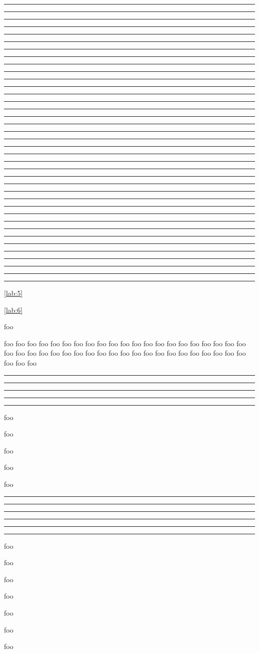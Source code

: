 \documentclass[UTF8,hyperref]{ctexart}
\def\testitem{\item\rule{\ecolswidth}{1pt}}
\begin{document}
\begin{enumcols}[3]
\testitem
\testitem
\testitem
\testitem
\testitem
\testitem
\testitem
\testitem
\testitem
\testitem
\testitem
\testitem
\testitem
\testitem
\testitem
\testitem
\testitem
\testitem
\testitem
\testitem
\end{enumcols}
\begin{enumcols}[6]
\testitem
\testitem
\testitem
\testitem
\testitem
\testitem
\testitem
\testitem
\testitem
\testitem
\testitem
\testitem
\testitem
\testitem
\testitem
\testitem
\testitem
\testitem
\end{enumcols}


\begin{enumlist}
\item\label{lab:1}
\item\label{lab:2}
\item\label{lab:3}
\item\label{lab:4}
\begin{enumcols}[counter=enumlist,format=\bfseries,label=(\arabic*),ref=(\Roman*)]
\item \label{lab:5}\ref{lab:5}
\item \label{lab:6}\ref{lab:6}
\item \label{lab:7}
\item foo
\item foo foo foo foo foo foo foo foo foo foo foo foo foo
      foo foo foo foo foo foo foo foo foo foo foo foo foo
      foo foo foo foo foo foo foo foo foo foo foo foo foo
      foo foo foo foo foo foo
\testitem
\testitem
\item\lipsum[1-5]
\testitem
\testitem
\testitem
\item\lipsum[6-10]
\item foo
\end{enumcols}
\item \label{lab:8}
\item \label{lab:9}
\item foo
\item foo
\item foo
\begin{enumcols}[counter=enumlist,format=\bfseries,label=(\arabic*)]
\item \label{lab:15}
\item \label{lab:16}
\item \label{lab:17}
\item foo
\testitem
\testitem
\testitem
\testitem
\testitem
\testitem
\item foo
\end{enumcols}
\item foo
\item foo
\item foo
\item foo
\item foo
\item foo
\end{enumlist}
\end{document}
